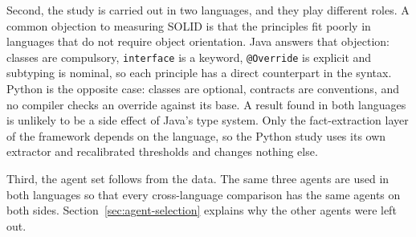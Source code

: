 Second, the study is carried out in two languages, and they play different roles. A common
objection to measuring SOLID is that the principles fit poorly in languages that do not require
object orientation. Java answers that objection: classes are compulsory, \texttt{interface} is a
keyword, \texttt{@Override} is explicit and subtyping is nominal, so each principle has a direct
counterpart in the syntax. Python is the opposite case: classes are optional, contracts are
conventions, and no compiler checks an override against its base. A result found in both languages
is unlikely to be a side effect of Java's type system. Only the fact-extraction layer of the
framework depends on the language, so the Python study uses its own extractor and recalibrated
thresholds and changes nothing else.

Third, the agent set follows from the data. The same three agents are used in both languages so
that every cross-language comparison has the same agents on both sides.
Section~\ref{sec:agent-selection} explains why the other agents were left out.
